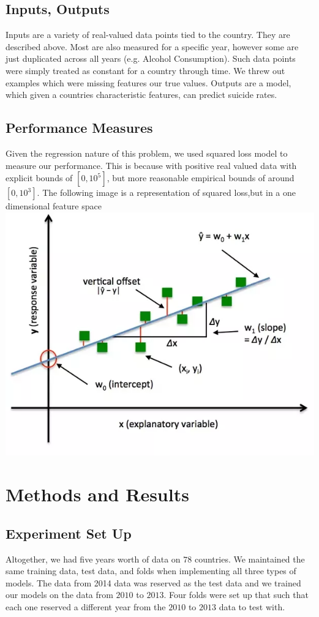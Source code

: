 \documentclass{article}
\begin{document}
\begin{multicols}{2}
\subsection{Inputs, Outputs} Inputs are a variety of real-valued data points tied to the country. They are described above. Most are also measured for a specific year, however some are just duplicated across all years (e.g. Alcohol Consumption). Such data points were simply treated as constant for a country through time. We threw out examples which were missing features our true values. Outputs are a model, which given a countries characteristic features, can predict suicide rates. 
\subsection{Performance Measures} Given the regression nature of this problem, we used squared loss model to measure our performance. This is because with positive real valued data with explicit bounds of $[0, 10^5]$, but more reasonable empirical bounds of around $[0, 10^3]$. The following image is a representation of squared loss,but in a one dimensional feature space 
\includegraphics[width=\columnwidth]{squared-loss.png}


\section{Methods and Results}
\subsection{Experiment Set Up} Altogether, we had five years worth of data on $78$ countries. We maintained the same training data, test data, and folds when implementing all three types of models. The data from 2014 data was reserved as the test data and we trained our models on the data from $2010$ to $2013$. Four folds were set up that such that each one reserved a different year from the $2010$ to $2013$ data to test with. 


\end{multicols}
\end{document}
